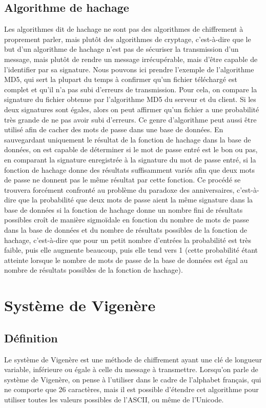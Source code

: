 		\subsection{Algorithme de hachage}
			Les algorithmes dit de hachage ne sont pas des algorithmes de chiffrement à proprement parler, mais plutôt des algorithmes de cryptage, c'est-à-dire que le but d'un algorithme de hachage n'est pas de sécuriser la transmission d'un message, mais plutôt de rendre un message irrécupérable, mais d'être capable de l'identifier par sa signature. Nous pouvons ici prendre l'exemple de l'algorithme MD5, qui sert la plupart du temps à confirmer qu'un fichier téléchargé est complet et qu'il n'a pas subi d'erreurs de transmission. Pour cela, on compare la signature du fichier obtenue par l'algorithme MD5 du serveur et du client. Si les deux signatures sont égales, alors on peut affirmer qu'un fichier a une probabilité très grande de ne pas avoir subi d'erreurs. Ce genre d'algorithme peut aussi être utilisé afin de cacher des mots de passe dans une base de données. En sauvegardant uniquement le résultat de la fonction de hachage dans la base de données, on est capable de déterminer si le mot de passe entré est le bon ou pas, en comparant la signature enregistrée à la signature du mot de passe entré, si la fonction de hachage donne des résultats suffisamment variés afin que deux mots de passe ne donnent pas le même résultat par cette fonction. Ce procédé se trouvera forcément confronté au problème du paradoxe des anniversaires, c'est-à-dire que la probabilité que deux mots de passe aient la même signature dans la base de données si la fonction de hachage donne un nombre fini de résultats possibles croît de manière sigmoïdale en fonction du nombre de mots de passe dans la base de données et du nombre de résultats possibles de la fonction de hachage, c'est-à-dire que pour un petit nombre d'entrées la probabilité est très faible, puis elle augmente beaucoup, puis elle tend vers 1 (cette probabilité étant atteinte lorsque le nombre de mots de passe de la base de données est égal au nombre de résultats possibles de la fonction de hachage).
	\section{Système de Vigenère}
		\subsection{Définition}
			Le système de Vigenère est une méthode de chiffrement ayant une clé de longueur variable, inférieure ou égale à celle du message à transmettre. Lorsqu'on parle de système de Vigenère, on pense à l'utiliser dans le cadre de l'alphabet français, qui ne comporte que 26 caractères, mais il est possible d'étendre cet algorithme pour utiliser toutes les valeurs possibles de l'ASCII, ou même de l'Unicode.
